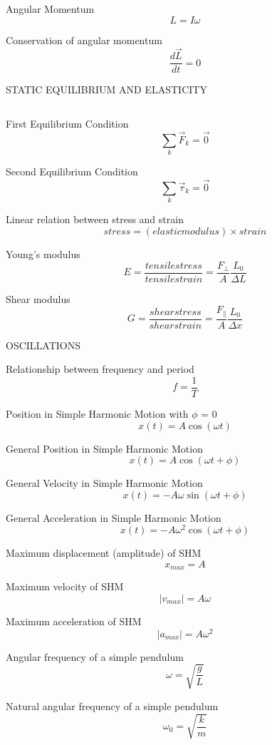 \documentclass[12pt, letterpaper, twoside]{article}
\begin{document}
Angular Momentum
$$  L = I \omega $$


Conservation of angular momentum
$$  \frac{d \overrightarrow{L}}{dt} = 0  $$





\newpage


STATIC EQUILIBRIUM AND ELASTICITY

$$ $$


First Equilibrium Condition
$$ \sum_k \overrightarrow{F}_k = \overrightarrow{0} $$


Second Equilibrium Condition
$$ \sum_k \overrightarrow{\tau}_k = \overrightarrow{0} $$


Linear relation between stress and strain
$$ stress = (elastic modulus) \times strain $$


Young's modulus
$$  E = \frac{tensile stress}{tensile strain} = \frac{F_\bot}{A} \frac{L_0}{\Delta L} $$


Shear modulus
$$  G = \frac{shear stress}{shear strain} = \frac{F_\parallel}{A} \frac{L_0}{\Delta x} $$





\newpage

OSCILLATIONS
$$ $$



Relationship between frequency and period
$$ f = \frac{1}{T} $$

Position in Simple Harmonic Motion with $\phi$ = 0
$$ x(t) = A \cos (\omega t) $$


General Position in Simple Harmonic Motion
$$ x(t)  = A \cos (\omega t + \phi) $$


General Velocity in Simple Harmonic Motion
$$ x(t)  = -A \omega \sin (\omega t + \phi) $$


General Acceleration in Simple Harmonic Motion
$$ x(t)  = -A \omega^2 \cos (\omega t + \phi) $$


Maximum displacement (amplitude) of SHM
$$ x_{max} = A $$


Maximum velocity of SHM
$$ |v_{max}| = A \omega $$


Maximum acceleration of SHM
$$ |a_{max}| = A \omega^2 $$



Angular frequency of a simple pendulum
$$ \omega = \sqrt{\frac{g}{L}} $$



Natural angular frequency of a simple pendulum
$$ \omega_0 = \sqrt{\frac{k}{m}} $$
\end{document}
